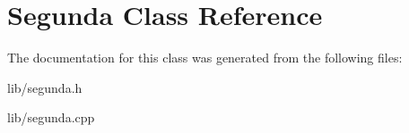 \hypertarget{class_segunda}{\section{Segunda Class Reference}
\label{class_segunda}
}


The documentation for this class was generated from the following files\+:\begin{DoxyCompactItemize}
\item 
lib/segunda.\+h\item 
lib/segunda.\+cpp\end{DoxyCompactItemize}
